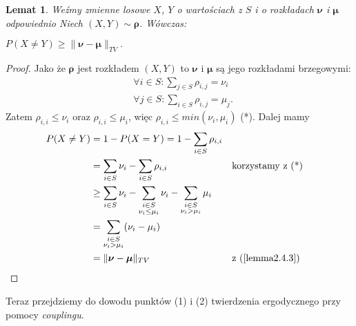 \documentclass[a4paper]{article}
\theoremstyle{defn}
\theoremstyle{theorem}
\theoremstyle{lemma}
\newtheorem{lemma}[defn]{Lemat}
\theoremstyle{cor}
\theoremstyle{fact}
\begin{document}
\begin{lemma}\label{lemma2.4.4}
Weźmy zmienne losowe $X$, $Y$ o wartościach z $S$ i o rozkładach $\boldsymbol{\nu}$ i $\boldsymbol{\mu}$ odpowiednio Niech $(X, Y) \sim \boldsymbol{\rho}$. Wówczas:
\begin{center}
$P(X \neq Y) \geq \|\boldsymbol{\nu} - \boldsymbol{\mu}\|_{TV}.$
\end{center}
\end{lemma}
\begin{proof}
Jako że $\boldsymbol{\rho}$ jest rozkładem $(X,Y)$ to $\boldsymbol{\nu}$ i $\boldsymbol{\mu}$ są jego rozkładami brzegowymi:
\begin{align*}
&\forall i \in S: \sum\limits_{j \in S} \rho_{i, j} = \nu_i\\
&\forall j \in S: \sum\limits_{i \in S} \rho_{i, j} = \mu_j.
\end{align*}
Zatem 
$\rho_{i, i} \leq \nu_i$ oraz $\rho_{i, i} \leq \mu_i$, więc $\rho_{i,i} \leq min(\nu_i, \mu_i)$ (*). Dalej mamy
\begin{align*}
P(X \neq Y) &= 1 - P(X = Y) = 1 - \sum\limits_{i \in S} \rho_{i, i} \\
&= \sum\limits_{i \in S} \nu_i - \sum\limits_{i \in S} \rho_{i, i}  && \text{korzystamy z (*)}\\
&\geq \sum\limits_{i \in S} \nu_i - \sum\limits_{\substack{i \in S\\ \nu_i \leq \mu_i}} \nu_i - \sum\limits_{\substack{i \in S\\ \nu_i > \mu_i}} \mu_i \\
&= \sum\limits_{\substack{i \in S\\ \nu_i > \mu_i}} (\nu_i - \mu_i) \\
&= \|\boldsymbol{\nu} - \boldsymbol{\mu}\|_{TV} && \text{z (\ref{lemma2.4.3})}
\end{align*}
\end{proof}

Teraz przejdziemy do dowodu punktów (1) i (2) twierdzenia ergodycznego przy pomocy \textit{couplingu}.
\end{document}
